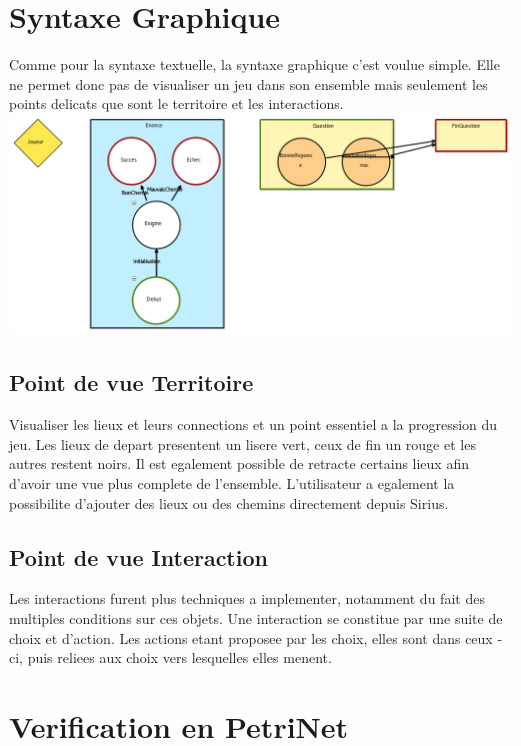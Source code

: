 \documentclass[12pt]{article}
\begin{document}
\section{Syntaxe Graphique}
Comme pour la syntaxe textuelle, la syntaxe graphique c'est voulue simple. Elle ne permet donc pas de visualiser un jeu dans son ensemble mais seulement les points delicats que sont le territoire et les interactions.
\newline\newline
\includegraphics[width=\textwidth]{images/diagram_JeuEnigme}
\newline\newline

\subsection{Point de vue Territoire}
Visualiser les lieux et leurs connections et un point essentiel a la progression du jeu. Les lieux de depart presentent un lisere vert, ceux de fin un rouge et les autres restent noirs. Il est egalement possible de retracte certains lieux afin d'avoir une vue plus complete de l'ensemble. L'utilisateur a egalement la possibilite d'ajouter des lieux ou des chemins directement depuis Sirius.

\subsection{Point de vue Interaction}
Les interactions furent plus techniques a implementer, notamment du fait des multiples conditions sur ces objets. Une interaction se constitue par une suite de choix et d'action. Les actions etant proposee par les choix, elles sont dans ceux -ci, puis reliees aux choix vers lesquelles elles menent.

\section{Verification en PetriNet}
\end{document}
